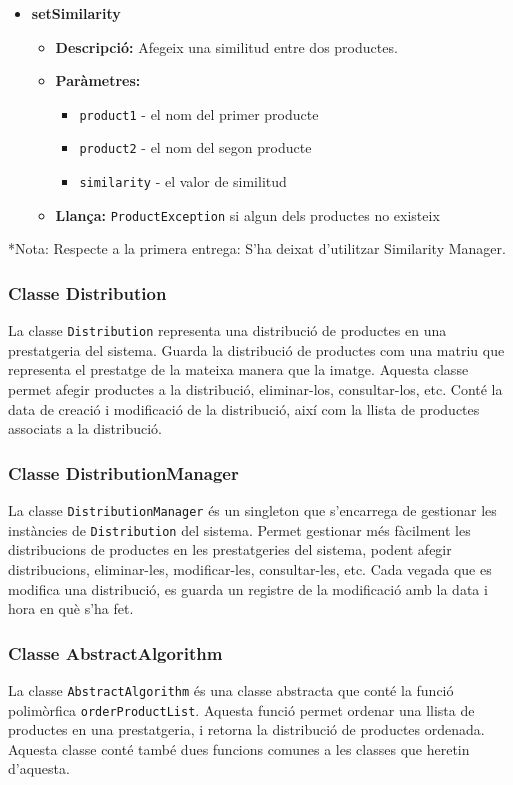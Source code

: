 \documentclass[a4paper, t]{article}
\begin{document}
\begin{itemize}
    \item \textbf{setSimilarity}
    \begin{itemize}
        \item \textbf{Descripció:} Afegeix una similitud entre dos productes.
        \item \textbf{Paràmetres:}
        \begin{itemize}
            \item \texttt{product1} - el nom del primer producte
            \item \texttt{product2} - el nom del segon producte
            \item \texttt{similarity} - el valor de similitud
        \end{itemize}
        \item \textbf{Llança:} \texttt{ProductException} si algun dels productes no existeix
    \end{itemize}
\end{itemize}

*Nota: Respecte a la primera entrega: S’ha deixat d’utilitzar Similarity Manager.

\subsubsection{Classe Distribution}
La classe \texttt{Distribution} representa una distribució de productes en una prestatgeria del sistema. 
Guarda la distribució de productes com una matriu que representa el prestatge de la mateixa manera que la imatge. 
Aquesta classe permet afegir productes a la distribució, eliminar-los, consultar-los, etc.
Conté la data de creació i modificació de la distribució, així com la llista de productes associats a la distribució.

\subsubsection{Classe DistributionManager}
La classe \texttt{DistributionManager} és un singleton que s’encarrega de gestionar les instàncies de \texttt{Distribution} del sistema. 
Permet gestionar més fàcilment les distribucions de productes en les prestatgeries del sistema, podent afegir distribucions,
eliminar-les, modificar-les, consultar-les, etc.
Cada vegada que es modifica una distribució, es guarda un registre de la modificació amb la data i hora en què s’ha fet.

\subsubsection{Classe AbstractAlgorithm}
La classe \texttt{AbstractAlgorithm} és una classe abstracta que conté la funció polimòrfica \texttt{orderProductList}.
Aquesta funció permet ordenar una llista de productes en una prestatgeria, i retorna la distribució de productes ordenada.
Aquesta classe conté també dues funcions comunes a les classes que heretin d’aquesta.
\end{document}
